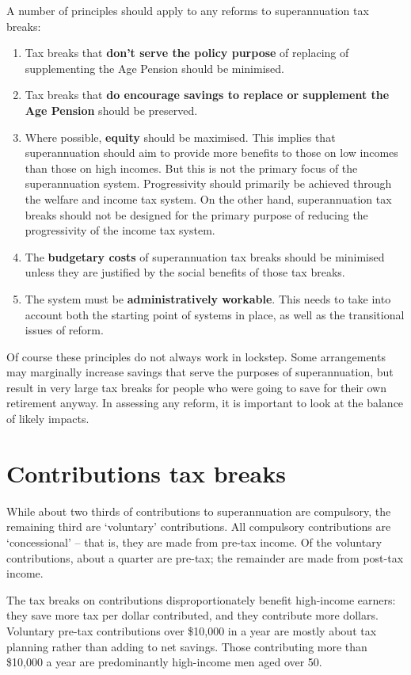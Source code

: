 \documentclass{grattanAlpha}
\begin{document}
A number of principles should apply to any reforms to superannuation tax breaks:
\begin{enumerate}
\item Tax breaks that \textbf{don't serve the policy purpose} of replacing of supplementing the Age Pension should be minimised.
\item	Tax breaks that \textbf{do encourage savings to replace or supplement the Age Pension} should be preserved. 
\item	Where possible, \textbf{equity} should be maximised. This implies that superannuation should aim to provide more benefits to those on low incomes than those on high incomes. But this is not the primary focus of the superannuation system. Progressivity should primarily be achieved through the welfare and income tax system. On the other hand, superannuation tax breaks should not be designed for the primary purpose of reducing the progressivity of the income tax system. 
\item	The \textbf{budgetary costs} of superannuation tax breaks should be minimised unless they are justified by the social benefits of those tax breaks.
\item	The system must be \textbf{administratively workable}. This needs to take into account both the starting point of systems in place, as well as the transitional issues of reform.
\end{enumerate}
Of course these principles do not always work in lockstep. Some arrangements may marginally increase savings that serve the purposes of superannuation, but result in very large tax breaks for people who were going to save for their own retirement anyway. In assessing any reform, it is important to look at the balance of likely impacts.

\chapter{Contributions tax breaks}
While about two thirds of contributions to superannuation are compulsory, the remaining third are ‘voluntary’ contributions. All compulsory contributions are ‘concessional’ – that is, they are made from pre-tax income. Of the voluntary contributions, about a quarter are pre-tax; the remainder are made from post-tax income.

The tax breaks on contributions disproportionately benefit high-income earners: they save more tax per dollar contributed, and they contribute more dollars. Voluntary pre-tax contributions over \$10,000 in a year are mostly about tax planning rather than adding to net savings. Those contributing more than \$10,000 a year are predominantly high-income men aged over 50. 
\end{document}
